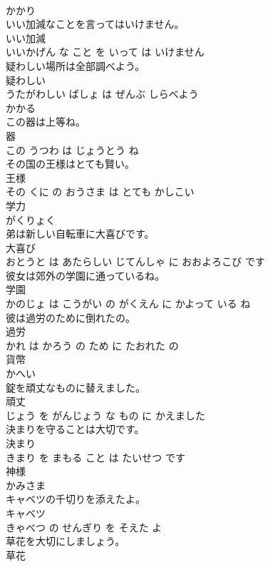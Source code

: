 \documentclass[8pt]{extreport}
\begin{document}
\begin{CJK}{UTF8}{min}
\\	かかり			
\\	いい加減なことを言ってはいけません。	
\\	いい加減 
\\	いいかげん な こと を いって は いけません			
\\	疑わしい場所は全部調べよう。	
\\	疑わしい 
\\	うたがわしい ばしょ は ぜんぶ しらべよう			
\\	かかる	
\\	この器は上等ね。	
\\	器 
\\	この うつわ は じょうとう ね			
\\	その国の王様はとても賢い。	
\\	王様 
\\	その くに の おうさま は とても かしこい			
\\	学力	
\\	がくりょく			
\\	弟は新しい自転車に大喜びです。	
\\	大喜び 
\\	おとうと は あたらしい じてんしゃ に おおよろこび です			
\\	彼女は郊外の学園に通っているね。	
\\	学園 
\\	かのじょ は こうがい の がくえん に かよって いる ね			
\\	彼は過労のために倒れたの。	
\\	過労 
\\	かれ は かろう の ため に たおれた の			
\\	貨幣	
\\	かへい			
\\	錠を頑丈なものに替えました。	
\\	頑丈 
\\	じょう を がんじょう な もの に かえました			
\\	決まりを守ることは大切です。	
\\	決まり 
\\	きまり を まもる こと は たいせつ です			
\\	神様	
\\	かみさま			
\\	キャベツの千切りを添えたよ。	
\\	キャベツ 
\\	きゃべつ の せんぎり を そえた よ			
\\	草花を大切にしましょう。	
\\	草花 

\end{CJK}
\end{document}
